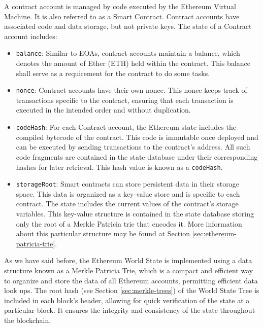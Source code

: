 A contract account is managed by code executed by the Ethereum Virtual Machine. It is also referred to as a Smart Contract. Contract accounts have associated code and data storage, but not private keys. The state of a Contract account includes:

\begin{itemize}

\item \texttt{balance}: Similar to EOAs, contract accounts maintain a balance, which denotes the amount of Ether (ETH) held within the contract. This balance shall serve as a requirement for the contract to do some tasks.

\item \texttt{nonce}: Contract accounts have their own nonce. This nonce keeps track of transactions specific to the contract, ensuring that each transaction is executed in the intended order and without duplication.

\item \texttt{codeHash}: For each Contract account, the Ethereum state includes the compiled bytecode of the contract. This code is immutable once deployed and can be executed by sending transactions to the contract's address. All such code fragments are contained in the state database under their corresponding hashes for later retrieval. This hash value is known as a \texttt{codeHash}.

\item \texttt{storageRoot}: Smart contracts can store persistent data in their storage space. This data is organized as a key-value store and is specific to each contract. The state includes the current values of the contract's storage variables. This key-value structure is contained in the state database storing only the root of a Merkle Patricia trie that encodes it. More information about this particular structure may be found at Section \ref{sec:ethereum-patricia-trie}.

\end{itemize}

As we have said before, the Ethereum World State is implemented using a data structure known as a Merkle Patricia Trie, which is a compact and efficient way to organize and store the data of all Ethereum accounts, permitting efficient data look ups. The root hash (see Section \ref{sec:merkle-trees}) of the World State Tree is included in each block's header, allowing for quick verification of the state at a particular block. It ensures the integrity and consistency of the state throughout the blockchain.

